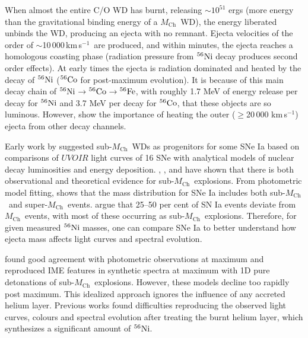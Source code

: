 \documentclass[useAMS,usenatbib,useasmath]{mnras}
\newcommand{\Mch}{\hbox{$M_{\text{Ch}}$}}
\newcommand{\kms}{\hbox{km$\,$s$^{-1}$}}
\newcommand{\elem}[2][default]{$^{#1}{\rm #2}$}
\begin{document}
When almost the entire C/O WD has burnt, releasing $\sim$$10^{51}$ ergs (more energy than the gravitational binding energy of a \Mch\ WD), the energy liberated unbinds the WD, producing an ejecta with no remnant. Ejecta velocities of the order of $\sim$10\,000\,\kms\ are produced, and within minutes, the ejecta reaches a homologous coasting phase (radiation pressure from \elem[56]{Ni} decay produces second order effects).  
At early times the ejecta is radiation dominated and heated by the decay of \elem[56]{Ni} (\elem[56]{Co} for post-maximum evolution).  It is because of this main decay chain of \elem[56]{Ni}$\rightarrow$\elem[56]{Co}$\rightarrow$\elem[56]{Fe}, with roughly 1.7 MeV of energy release per decay for \elem[56]{Ni} and 3.7 MeV per decay for \elem[56]{Co}, that these objects are so luminous. However, \cite{Dessart2014a} show the importance of heating the outer ($\ge$20\,000 \kms) ejecta from other decay channels. 

Early work by \cite{Stritzinger2006a} suggested sub-\Mch\ WDs as progenitors for some SNe Ia based on comparisons of $UVOIR$ light curves of 16 SNe with analytical models of nuclear decay luminosities and energy deposition. \cite{Scalzo2014a,Scalzo2014b}, \cite{Sim_2010,Sim2013}, and \cite{Blondin2017} have shown that there is both observational and theoretical evidence for sub-\Mch\ explosions. From photometric model fitting, \cite{Scalzo2014a,Scalzo2014b} shows that the mass distribution for SNe Ia includes both sub-\Mch\ and super-\Mch\ events. \cite{Scalzo2014b} argue that 25--50 per cent of SN Ia events deviate from \Mch\ events, with most of these occurring as sub-\Mch\ explosions. Therefore, for given measured \elem[56]{Ni} masses, one can compare SNe Ia to better understand how ejecta mass affects light curves and spectral evolution. 

\cite{Sim_2010,Sim2013} found good agreement with photometric observations at maximum and reproduced IME features in synthetic spectra at maximum with 1D pure detonations of sub-\Mch\ explosions. However, these models decline too rapidly post maximum. This idealized approach ignores the influence of any accreted helium layer. Previous works \citep{Woosley1994,Livne1995,HoeflichKhokhlov1996,Hoeflich1996,Nugent1997,Kromer2010} found difficulties reproducing the observed light curves, colours and spectral evolution after treating the burnt helium layer, which synthesizes a significant amount of \elem[56]{Ni}. 
\end{document}
